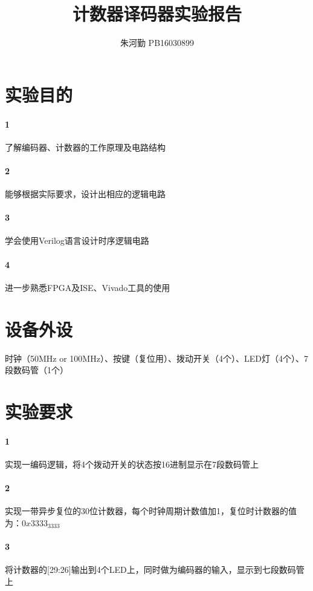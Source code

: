 \documentclass[UTF8]{ctexart}
\title{计数器译码器实验报告}
\author{朱河勤   PB16030899}
\begin{document}
\maketitle
\tableofcontents

\section{实验目的}

\paragraph{1}了解编码器、计数器的工作原理及电路结构
\paragraph{2}能够根据实际要求，设计出相应的逻辑电路
\paragraph{3}学会使用Verilog语言设计时序逻辑电路
\paragraph{4}进一步熟悉FPGA及ISE、Vivado工具的使用


\section{设备外设}
时钟（50MHz or 100MHz）、按键（复位用）、拨动开关（4个）、LED灯（4个）、7段数码管（1个）

\section{实验要求}
\paragraph{1}实现一编码逻辑，将4个拨动开关的状态按16进制显示在7段数码管上
\paragraph{2}实现一带异步复位的30位计数器，每个时钟周期计数值加1，复位时计数器的值为：$0x3333_3333$
\paragraph{3}将计数器的[29:26]输出到4个LED上，同时做为编码器的输入，显示到七段数码管上
\end{document}

